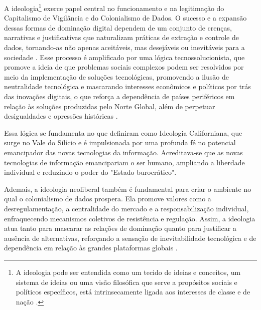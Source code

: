 A ideologia\footnote{
A ideologia pode ser entendida como um tecido de ideias e conceitos, um sistema de ideias ou uma visão filosófica que serve a propósitos sociais e políticos específicos,  está intrinsecamente ligada aos interesses de classe e de nação \cite{vieirapinto1963}.
} exerce papel central no funcionamento e na legitimação do Capitalismo de Vigilância e do Colonialismo de Dados. O sucesso e a expansão dessas formas de dominação digital dependem de um conjunto de crenças, narrativas e justificativas que naturalizam práticas de extração e controle de dados, tornando-as não apenas aceitáveis, mas desejáveis ou inevitáveis para a sociedade \cite{Zuboff2019}. Esse processo é amplificado por uma lógica tecnossolucionista, que promove a ideia de que problemas sociais complexos podem ser resolvidos por meio da implementação de soluções tecnológicas, promovendo a ilusão de neutralidade tecnológica e mascarando interesses econômicos e políticos por trás das inovações digitais, o que reforça a dependência de países periféricos em relação às soluções produzidas pelo Norte Global, além de perpetuar desigualdades e opressões históricas \cite{Faustino2023}.

Essa lógica se fundamenta no que  definiram como Ideologia Californiana, que surge no Vale do Silício e é impulsionada por uma profunda fé no potencial emancipador das novas tecnologias da informação. Acreditava-se que as novas tecnologias de informação emancipariam o ser humano, ampliando a liberdade individual e reduzindo o poder do "Estado burocrático".

Ademais, a ideologia neoliberal também é fundamental para criar o ambiente no qual o colonialismo de dados prospera. Ela promove valores como a desregulamentação, a centralidade do mercado e a responsabilização individual, enfraquecendo mecanismos coletivos de resistência e regulação. Assim, a ideologia atua tanto para mascarar as relações de dominação quanto para justificar a ausência de alternativas, reforçando a sensação de inevitabilidade tecnológica e de dependência em relação às grandes plataformas globais \cite{Faustino2023}.


